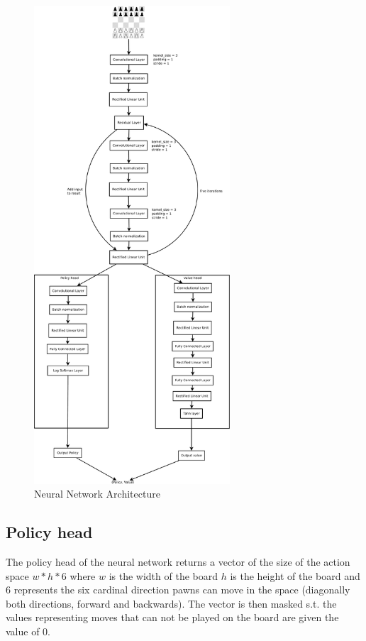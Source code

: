 \begin{figure}[]
    \centering

    \includegraphics[width=0.65\textwidth]{graphics/test}
    
    \caption{Neural Network Architecture}
    \label{fig:nnarch}
\end{figure}

\subsection{Policy head}

The policy head of the neural network returns a vector of the size of the action space $w * h * 6$ where $w$ is the width of the board $h$ is the height of the board and $6$ represents the six cardinal direction pawns can move in the space (diagonally both directions, forward and backwards). The vector is then masked s.t. the values representing moves that can not be played on the board are given the value of $0$.

